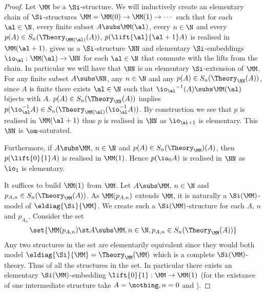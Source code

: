 \begin{proof}
    Let $\MM$ be a $\Si$-structure.
    We will inductively create an elementary chain of $\Si$-structures
    $\MM = \MM(0) \to \MM(1) \to \cdots$ such that for each $\al \in \N$,
    every finite subset $A \subs \MM(\al)$, 
    every $n \in \N$ and every $p(A) \in S_n(\Theory_{\MM(\al)}(A))$,
    $p(\lift{\al}{\al + 1} A)$ is realised in $\MM(\al + 1)$.
    gives us a $\Si$-structure $\NN$ and elementary $\Si$-embeddings 
    $\io_\al : \MM(\al) \to \NN$ for each $\al \in \N$ that commute with 
    the lifts from the chain.
    In particular we will have that $\NN$ is an elementary $\Si$-extension
    of $\MM$.
    For any finite subset $A \subs \NN$, 
    any $n \in \N$ and any $p(A) \in S_n(\Theory_{\NN}(A))$,
    since $A$ is finite there exists $\al \in \N$ such that 
    ${\io_\al}^{-1}(A) \subs \MM(\al)$ bijects with $A$.
    $p(A) \in S_n(\Theory_{\NN}(A))$ implies 
    $p(\io_\al^{-1} A) \in S_n(\Theory_{\MM(\al)}(\io_\al^{-1} A))$.
    By construction we see that
    $p$ is realised in $\MM(\al + 1)$
    thus $p$ is realised in $\NN$ as $\io_{\al + 1}$ is elementary.
    This $\NN$ is $\om$-saturated.

    Furthermore, 
    if $A \subs \MM$, $n \in \N$ and $p(A) \in S_n(\Theory_{\MM})(A)$,
    then $p(\lift{0}{1} A)$ is realised in $\MM(1)$.
    Hence $p(\io_0 A)$ is realised in $\NN$ as $\io_{1}$ is elementary.

    It suffices to build $\MM(1)$ from $\MM$.
    Let $A \subs \MM$, $n \in \N$ and $p_{A,n} \in S_n(\Theory_\MM (A))$.
    As $\MM(p_{A,n})$ extends $\MM$, 
    it is naturally a $\Si(\MM)$-model of $\eldiag{\Si}{\MM}$.
    We create such a $\Si(\MM)$-structure for each $A$, $n$ and $p_{A_n}$.
    Consider the set 
    \[\set{\MM(p_{A,n}) \st A \subs \MM, 
    n \in \N, p_{A,n} \in S_n(\Theory_\MM (A))}\]
    Any two structures in the set are elementarily equivalent since 
    they would both model $\eldiag{\Si}{\MM} = \Theory_\MM(\MM)$ 
    which is a complete $\Si(\MM)$-theory.
    Thus 
    of all the structures in the set. 
    In particular there exists 
    an elementary $\Si(\MM)$-embedding $\lift{0}{1} : \MM \to \MM(1)$
    (for the existance of one intermediate structure take 
    $A = \nothing, n = 0$ and ).


\end{proof}
